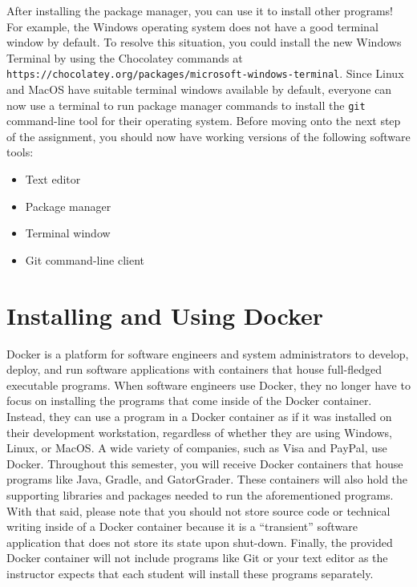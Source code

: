 \documentclass[11pt]{article}
\newcommand{\program}[1]{\lstinline{#1}}
\newcommand{\url}[1]{\lstinline{#1}}
\begin{document}
After installing the package manager, you can use it to install other programs!
For example, the Windows operating system does not have a good terminal window
by default. To resolve this situation, you could install the new Windows Terminal
by using the Chocolatey commands at
\url{https://chocolatey.org/packages/microsoft-windows-terminal}. Since Linux
and MacOS have suitable terminal windows available by default, everyone can now
use a terminal to run package manager commands to install the \program{git}
command-line tool for their operating system. Before moving onto the next step
of the assignment, you should now have working versions of the following
software tools:

\begin{itemize}

  \item Text editor

  \item Package manager

  \item Terminal window

  \item Git command-line client

\end{itemize}

\section*{Installing and Using Docker}

Docker is a platform for software engineers and system administrators to
develop, deploy, and run software applications with containers that house
full-fledged executable programs. When software engineers use Docker, they no
longer have to focus on installing the programs that come inside of the Docker
container. Instead, they can use a program in a Docker container as if it was
installed on their development workstation, regardless of whether they are using
Windows, Linux, or MacOS. A wide variety of companies, such as Visa and PayPal,
use Docker. Throughout this semester, you will receive Docker containers that
house programs like Java, Gradle, and GatorGrader. These containers will also
hold the supporting libraries and packages needed to run the aforementioned
programs. With that said, please note that you should not store source code or
technical writing inside of a Docker container because it is a ``transient''
software application that does not store its state upon shut-down. Finally, the
provided Docker container will not include programs like Git or your text editor
as the instructor expects that each student will install these programs
separately.
\end{document}
